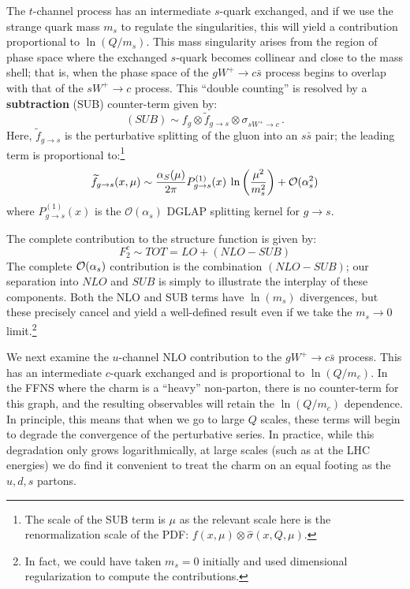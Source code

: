 %
The $t$-channel process has an intermediate $s$-quark exchanged, and
if we use the strange quark mass $m_{s}$ to regulate the
singularities, this will yield a contribution proportional to
$\ln(Q/m_{s})$. This mass singularity arises from the region of phase
space where the exchanged $s$-quark becomes collinear and close to the
mass shell; that is, when the phase space of the
\mbox{$gW^{+}\to c\bar{s}$} process begins to overlap with that of the
\mbox{$sW^{+}\to c$} process. This ``double counting'' is resolved by
a \textbf{subtraction} (SUB) counter-term
given by:
\[
(SUB)\sim f_{g}\otimes\widetilde{f}_{g\to s}\otimes\sigma_{sW^{+}\to
  c}\,.
\]
Here, $\widetilde{f}_{g\to s}$ is the perturbative splitting of the
gluon into an $s\bar{s}$ pair; the leading term is proportional
to:\footnote{The scale of the SUB term is $\mu$ as the relevant scale
  here is the renormalization scale of the PDF:
  $f(x,\mu)\otimes\hat{\sigma}(x,Q,\mu)$.}
\[
\widetilde{f}_{g\to s}(x,\mu)\sim\frac{\alpha_{S}(\mu)}{2\pi}P_{g\to
  s}^{(1)}(x)\:\ln\left(\frac{\mu^{2}}{m_{s}^{2}}\right)+
  {\cal   O}(\alpha_{s}^{2})
\]
where $P_{g\to s}^{(1)}(x)$ is the $\mathcal{O}(\alpha_{s})$ DGLAP
splitting kernel for \hbox{$g\to s$}.

The complete contribution to the structure function is given by:
\[
F_{2}^{c}\sim TOT=LO+(NLO-SUB)
\]
The complete ${\cal O}(\alpha_{s})$ contribution is the combination
$(NLO-SUB)$; our separation into $NLO$ and $SUB$ is simply to
illustrate the interplay of these components. Both the NLO and SUB
terms have $\ln(m_{s})$ divergences, but these precisely cancel and
yield a well-defined result even if we take the $m_{s}\to 0$
limit.\footnote{In fact, we could have taken $m_{s}=0$ initially and
  used dimensional regularization to compute the contributions.}

%
We next examine the $u$-channel NLO contribution to the
\mbox{$gW^{+}\to c\bar{s}$} process. This has an intermediate
$c$-quark exchanged and is proportional to $\ln(Q/m_{c})$. In the FFNS
where the charm is a ``heavy'' non-parton, there is no counter-term
for this graph, and the resulting observables will retain the
$\ln(Q/m_{c})$ dependence. In principle, this means that when we go to
large $Q$ scales, these terms will begin to degrade the convergence of
the perturbative series. In practice, while this degradation only
grows logarithmically, at large scales (such as at the LHC energies)
we do find it convenient to treat the charm on an equal footing as the
${u,d,s}$ partons.

